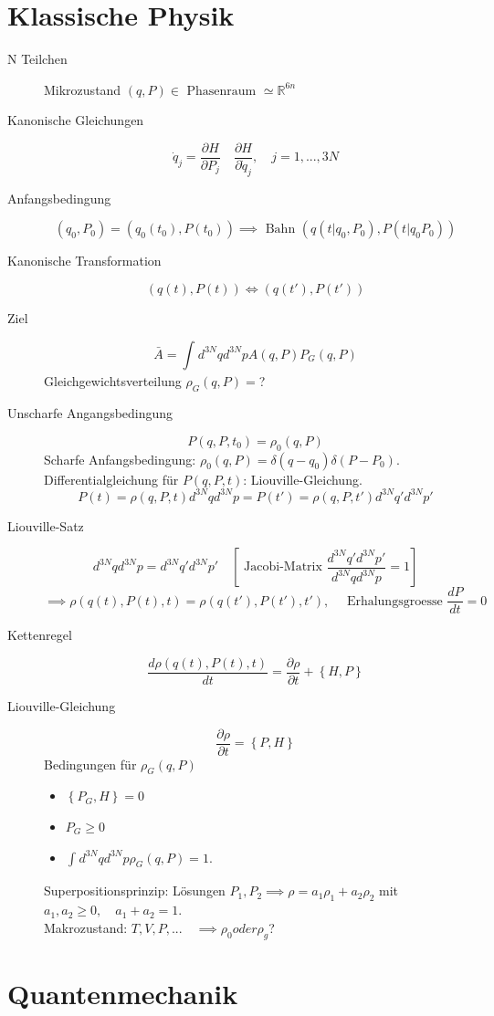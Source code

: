 \documentclass[11pt]{article}
\theoremstyle{plain}
\newcommand{\R}{\mathbb{R}}
\newcommand{\pd}[2]{\frac{\partial #1 }{\partial #2}}
\begin{document}
\section{Klassische Physik}
\begin{description}
  \item[N Teilchen ] Mikrozustand $(q,P) \in  \text{ Phasenraum } \simeq \R^{6n}$
  \item[Kanonische Gleichungen] \[ \dot{q}_j = \pd{H}{P_j} \quad \pd{H}{\dot{q}_j}, \quad j=1,...,3N \] 
  \item[Anfangsbedingung] \[ (q_0, P_0)= (q_0(t_0), P(t_0)) \implies \text{ Bahn } (q(t | q_0, P_0), P(t| q_0 P_0)) \] 
  \item[Kanonische Transformation ] \[ (q(t), P(t)) \iff (q(t'), P(t')) \] 
  \item[Ziel] \[ \bar{A}= \int_{}^{} d^{3N}q d^{3N}p A(q,P) P_G(q,P) \] 
    Gleichgewichtsverteilung $\rho_G(q,P)= $?
  \item[Unscharfe Angangsbedingung] \[ P(q,P,t_0)= \rho_0 (q,P) \] 
    Scharfe Anfangsbedingung: $\rho_0(q,P) = \delta(q-q_0) \delta (P-P_0)$.
    Differentialgleichung f\"ur $P(q,P,t)$: Liouville-Gleichung.
    \[ P(t)= \rho(q,P,t)d^{3N}q d^{3N}p=P(t') = \rho(q,P,t')d^{3N}q' d^{3N}p' \] 
  \item[Liouville-Satz] \[ d^{3N}q d^{3N}p = d^{3N}q' d^{3N}p' \quad \left[ \text{ Jacobi-Matrix } \frac{d^{3N}q' d^{3N}p'}{d^{3N}q d^{3N}p}= 1 \right] \] 
    \[ \implies \rho(q(t), P(t), t)= \rho (q(t'), P(t'), t'), \quad \text{ Erhalungsgroesse } \frac{dP}{dt}=0 \] 
  \item[Kettenregel] \[ \frac{d \rho(q(t), P(t),t)}{dt}= \pd{\rho}{t} + \left\{ H,P \right\} \] 
  \item[Liouville-Gleichung] \[ \pd{\rho}{t}= \left\{ P,H \right\} \] 
    Bedingungen f\"ur $\rho_G(q,P)$
    \begin{itemize}
      \item $\left\{ P_G, H \right\}=0$
      \item $P_G \ge 0$
      \item $\int_{}^{}d^{3N}q d^{3N}p \rho_G (q,P)=1$.
    \end{itemize}
    Superpositionsprinzip: L\"osungen $P_1,P_2 \implies \rho=a_1 \rho_1+ a_2 \rho_2 $
    mit $a_1,a_2 \ge 0, \quad a_1+a_2 =1$. \\
    Makrozustand: $T,V,P,... \quad  \implies \rho_0 oder \rho_g$?\\
\end{description}
\section{Quantenmechanik}
\end{document}
